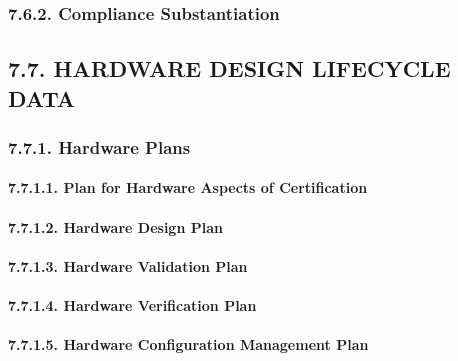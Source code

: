 \documentclass[
]{article}
\begin{document}
\hypertarget{compliance-substantiation}{%
\subsubsection{7.6.2. Compliance
Substantiation}\label{compliance-substantiation}}

\hypertarget{hardware-design-lifecycle-data}{%
\subsection{7.7. HARDWARE DESIGN LIFECYCLE
DATA}\label{hardware-design-lifecycle-data}}

\hypertarget{hardware-plans}{%
\subsubsection{7.7.1. Hardware Plans}\label{hardware-plans}}

\hypertarget{plan-for-hardware-aspects-of-certification}{%
\paragraph{7.7.1.1. Plan for Hardware Aspects of
Certification}\label{plan-for-hardware-aspects-of-certification}}

\hypertarget{hardware-design-plan}{%
\paragraph{7.7.1.2. Hardware Design Plan}\label{hardware-design-plan}}

\hypertarget{hardware-validation-plan}{%
\paragraph{7.7.1.3. Hardware Validation
Plan}\label{hardware-validation-plan}}

\hypertarget{hardware-verification-plan}{%
\paragraph{7.7.1.4. Hardware Verification
Plan}\label{hardware-verification-plan}}

\hypertarget{hardware-configuration-management-plan}{%
\paragraph{7.7.1.5. Hardware Configuration Management
Plan}\label{hardware-configuration-management-plan}}
\end{document}

